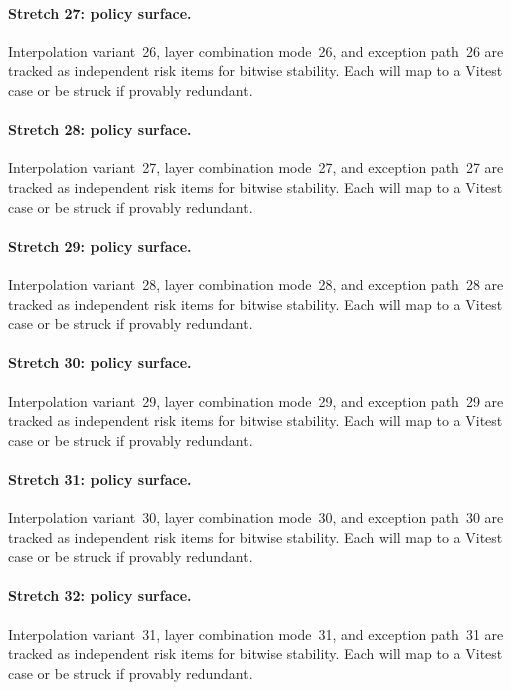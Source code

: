 \documentclass[sigconf,nonacm]{acmart}
\begin{document}
\paragraph{Stretch 27: policy surface.}
Interpolation variant~26, layer combination mode~26, and exception path~26 are tracked as independent risk items for bitwise stability. Each will map to a Vitest case or be struck if provably redundant. %

\paragraph{Stretch 28: policy surface.}
Interpolation variant~27, layer combination mode~27, and exception path~27 are tracked as independent risk items for bitwise stability. Each will map to a Vitest case or be struck if provably redundant. %

\paragraph{Stretch 29: policy surface.}
Interpolation variant~28, layer combination mode~28, and exception path~28 are tracked as independent risk items for bitwise stability. Each will map to a Vitest case or be struck if provably redundant. %

\paragraph{Stretch 30: policy surface.}
Interpolation variant~29, layer combination mode~29, and exception path~29 are tracked as independent risk items for bitwise stability. Each will map to a Vitest case or be struck if provably redundant. %

\paragraph{Stretch 31: policy surface.}
Interpolation variant~30, layer combination mode~30, and exception path~30 are tracked as independent risk items for bitwise stability. Each will map to a Vitest case or be struck if provably redundant. %

\paragraph{Stretch 32: policy surface.}
Interpolation variant~31, layer combination mode~31, and exception path~31 are tracked as independent risk items for bitwise stability. Each will map to a Vitest case or be struck if provably redundant. %
\end{document}
